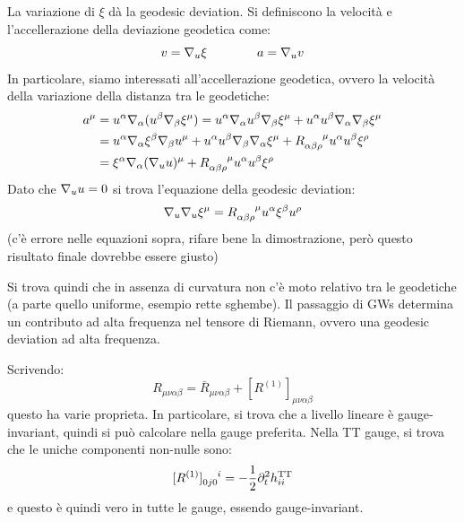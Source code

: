 La variazione di $ \xi $ dà la geodesic deviation. Si definiscono la velocità e l'accellerazione della deviazione geodetica come:
\begin{equation}
  v = \nabla_u \xi
  \qquad \qquad
  a = \nabla_u v
\end{equation}
In particolare, siamo interessati all'accellerazione geodetica, ovvero la velocità della variazione della distanza tra le geodetiche:
\begin{equation*}
  \begin{split}
    a^\mu
    & = u^\alpha \na_\alpha (u^\beta \na_\beta \xi^\mu) = u^\alpha \na_\alpha u^\beta \na_\beta \xi^\mu + u^\alpha u^\beta \na_\alpha \na_\beta \xi^\mu \\
    & = u^\alpha \na_\alpha \xi^\beta \na_\beta u^\mu + u^\alpha u^\beta \na_\beta \na_\alpha \xi^\mu + \tensor{R}{_{\alpha \beta \rho}^\mu} u^\alpha u^\beta \xi^\rho \\
    & = \xi^\alpha \na_\alpha (\na_u u)^\mu + \tensor{R}{_{\alpha \beta \rho}^\mu} u^\alpha u^\beta \xi^\rho
  \end{split}
\end{equation*}
Dato che $ \nabla_u u = 0 $ si trova l'equazione della geodesic deviation:
\begin{equation}
  \na_u \na_u \xi^\mu = \tensor{R}{_{\alpha \beta \rho}^\mu} u^\alpha \xi^\beta u^\rho
\end{equation}
(c'è errore nelle equazioni sopra, rifare bene la dimostrazione, però questo risultato finale dovrebbe essere giusto)

Si trova quindi che in assenza di curvatura non c'è moto relativo tra le geodetiche (a parte quello uniforme, esempio rette sghembe). Il passaggio di GWs determina un contributo ad alta frequenza nel tensore di Riemann, ovvero una geodesic deviation ad alta frequenza.

Scrivendo:
\begin{equation*}
  R_{\mu \nu \alpha \beta} = \bar{R}_{\mu \nu \alpha \beta} + [R^{(1)}]_{\mu \nu \alpha \beta}
\end{equation*}
questo ha varie proprieta. In particolare, si trova che a livello lineare è gauge-invariant, quindi si può calcolare nella gauge preferita. Nella TT gauge, si trova che le uniche componenti non-nulle sono:
\begin{equation*}
  \tensor{[R^{(1)}]}{_{0j0}^i} = -\frac{1}{2} \pa_t^2 h^\text{TT}_{ii}
\end{equation*}
e questo è quindi vero in tutte le gauge, essendo gauge-invariant.


